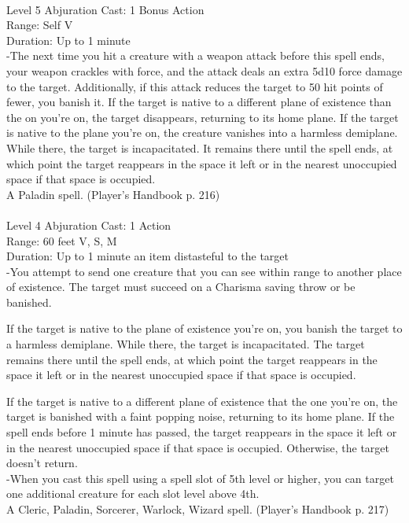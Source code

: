 \documentclass[10pt,twocolumn]{report}
\begin{document}
 \\
Level 5 \quad Abjuration \quad Cast: 1 Bonus Action\\
Range: Self \quad V\\
Duration: Up to 1 minute \quad \\
-The next time you hit a creature with a weapon attack before this spell ends, your weapon crackles with force, and the attack deals an extra 5d10 force damage to the target. Additionally, if this attack reduces the target to 50 hit points of fewer, you banish it. If the target is native to a different plane of existence than the on you’re on, the target disappears, returning to its home plane. If the target is native to the plane you’re on, the creature vanishes into a harmless demiplane. While there, the target is incapacitated. It remains there until the spell ends, at which point the target reappears in the space it left or in the nearest unoccupied space if that space is occupied.\\
A Paladin spell. (Player's Handbook p. 216) \\


 \\
Level 4 \quad Abjuration \quad Cast: 1 Action\\
Range: 60 feet \quad V, S, M\\
Duration: Up to 1 minute \quad an item distasteful to the target\\
-You attempt to send one creature that you can see within range to another place of existence. The target must succeed on a Charisma saving throw or be banished. 

If the target is native to the plane of existence you’re on, you banish the target to a harmless demiplane. While there, the target is incapacitated. The target remains there until the spell ends, at which point the target reappears in the space it left or in the nearest unoccupied space if that space is occupied. 

If the target is native to a different plane of existence that the one you’re on, the target is banished with a faint popping noise, returning to its home plane. 
If the spell ends before 1 minute has passed, the target reappears in the space it left or in the nearest unoccupied space if that space is occupied. Otherwise, the target doesn’t return.\\
-When you cast this spell using a spell slot of 5th level or higher, you can target one additional creature for each slot level above 4th.\\
A Cleric, Paladin, Sorcerer, Warlock, Wizard spell. (Player's Handbook p. 217) \\
\end{document}
